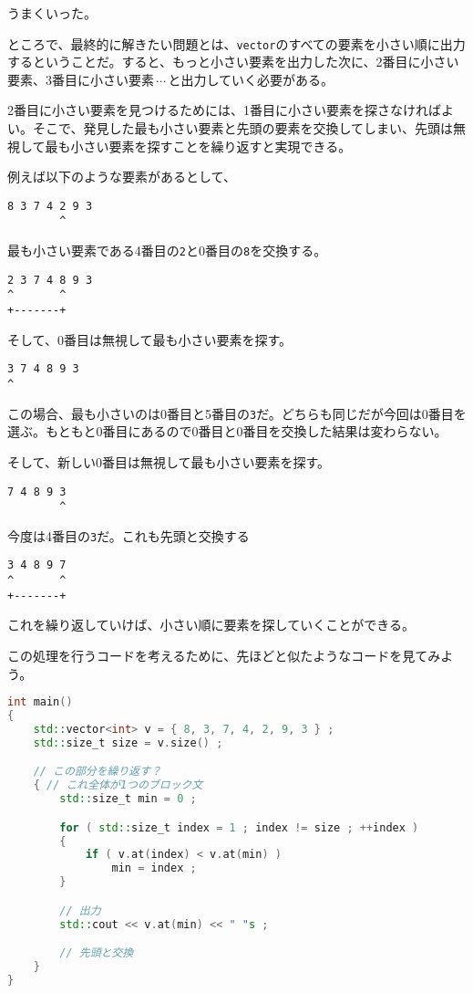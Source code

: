 うまくいった。

ところで、最終的に解きたい問題とは、\texttt{vector}のすべての要素を小さい順に出力するということだ。すると、もっと小さい要素を出力した次に、2番目に小さい要素、3番目に小さい要素{$\,\cdots\,$}と出力していく必要がある。

2番目に小さい要素を見つけるためには、1番目に小さい要素を探さなければよい。そこで、発見した最も小さい要素と先頭の要素を交換してしまい、先頭は無視して最も小さい要素を探すことを繰り返すと実現できる。

例えば以下のような要素があるとして、
\begin{lstlisting}[style=terminal]
8 3 7 4 2 9 3
        ^
\end{lstlisting}
最も小さい要素である4番目の\texttt{2}と0番目の\texttt{8}を交換する。

\begin{lstlisting}[style=terminal]
2 3 7 4 8 9 3
^       ^
+-------+
\end{lstlisting}

そして、0番目は無視して最も小さい要素を探す。

\begin{lstlisting}[style=terminal]
3 7 4 8 9 3
^
\end{lstlisting}

この場合、最も小さいのは0番目と5番目の\texttt{3}だ。どちらも同じだが今回は0番目を選ぶ。もともと0番目にあるので0番目と0番目を交換した結果は変わらない。

そして、新しい0番目は無視して最も小さい要素を探す。

\begin{lstlisting}[style=terminal]
7 4 8 9 3
        ^
\end{lstlisting}

今度は4番目の\texttt{3}だ。これも先頭と交換する

\begin{lstlisting}[style=terminal]
3 4 8 9 7
^       ^
+-------+
\end{lstlisting}

これを繰り返していけば、小さい順に要素を探していくことができる。

この処理を行うコードを考えるために、先ほどと似たようなコードを見てみよう。

\ifTombow\pagebreak\fi
\begin{lstlisting}[language={C++}]
int main()
{
    std::vector<int> v = { 8, 3, 7, 4, 2, 9, 3 } ;
    std::size_t size = v.size() ;

    // この部分を繰り返す？ 
    { // これ全体が1つのブロック文
        std::size_t min = 0 ;

        for ( std::size_t index = 1 ; index != size ; ++index )
        {
            if ( v.at(index) < v.at(min) )
                min = index ;
        }

        // 出力
        std::cout << v.at(min) << " "s ;

        // 先頭と交換
    }
}
\end{lstlisting}

